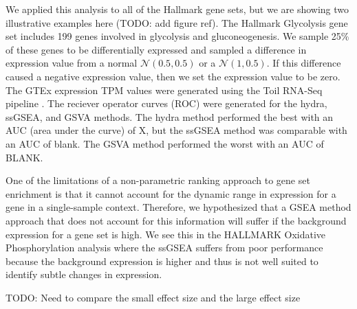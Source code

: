 \documentclass[fleqn,10pt]{wlscirep}
\begin{document}
We applied this analysis to all of the Hallmark gene sets, but we are showing two illustrative examples here (TODO: add figure ref). The Hallmark Glycolysis gene set includes 199 genes involved in glycolysis and gluconeogenesis. We sample 25\% of these genes to be differentially expressed and sampled a difference in expression value from a normal $\mathcal{N}(0.5, 0.5)$ or a $\mathcal{N}(1, 0.5)$. If this difference caused a negative expression value, then we set the expression value to be zero. The GTEx expression TPM values were generated using the Toil RNA-Seq pipeline \cite{vivian2017toil}. The reciever operator curves (ROC) were generated for the hydra, ssGSEA, and GSVA methods. The hydra method performed the best with an AUC (area under the curve) of X, but the ssGSEA method was comparable with an AUC of blank. The GSVA method performed the worst with an AUC of BLANK. 

One of the limitations of a non-parametric ranking approach to gene set enrichment is that it cannot account for the dynamic range in expression for a gene in a single-sample context. Therefore, we hypothesized that a GSEA method approach that does not account for this information will suffer if the background expression for a gene set is high. We see this in the HALLMARK Oxidative Phosphorylation analysis where the ssGSEA suffers from poor performance because the background expression is higher and thus is not well suited to identify subtle changes in expression.

TODO: Need to compare the small effect size and the large effect size 
\end{document}
